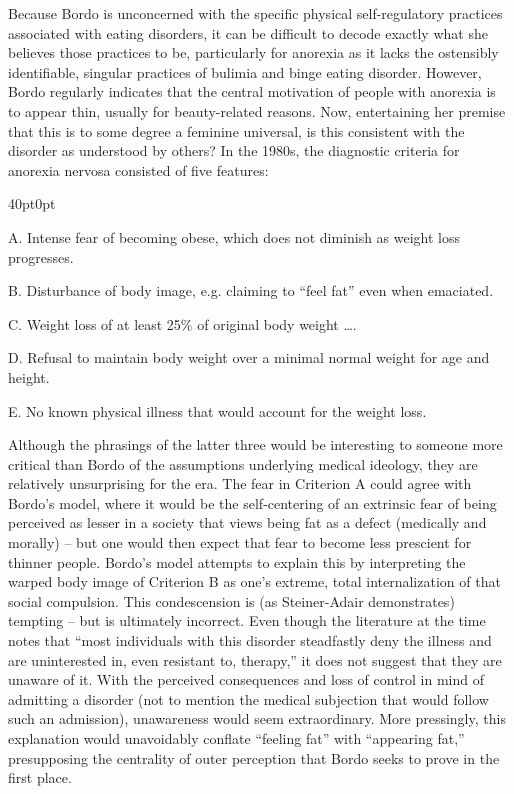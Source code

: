 \documentclass[11pt]{article}
\begin{document}
    Because Bordo is unconcerned with the specific physical self-regulatory practices associated with eating disorders, it can be difficult to decode exactly what she believes those practices to be, particularly for anorexia as it lacks the ostensibly identifiable, singular practices of bulimia and binge eating disorder. However, Bordo regularly indicates that the central motivation of people with anorexia is to appear thin, usually for beauty-related reasons. Now, entertaining her premise that this is to some degree a feminine universal, is this consistent with the disorder as understood by others? In the 1980s, the diagnostic criteria for anorexia nervosa consisted of five features:
    \begin{adjustwidth}{40pt}{0pt}
        \begin{flushleft}
        A. Intense fear of becoming obese, which does not diminish as weight loss progresses.

        B. Disturbance of body image, e.g. claiming to ``feel fat'' even when emaciated.

        C. Weight loss of at least 25\% of original body weight \dots.

        D. Refusal to maintain body weight over a minimal normal weight for age and height.

        E. No known physical illness that would account for the weight loss.~\autocite[68--69]{DSMIII}
        \end{flushleft}
    \end{adjustwidth}
    Although the phrasings of the latter three would be interesting to someone more critical than Bordo of the assumptions underlying medical ideology, they are relatively unsurprising for the era. The fear in Criterion A could agree with Bordo's model, where it would be the self-centering of an extrinsic fear of being perceived as lesser in a society that views being fat as a defect (medically and morally) -- but one would then expect that fear to become less prescient for thinner people. Bordo's model attempts to explain this by interpreting the warped body image of Criterion B as one's extreme, total internalization of that social compulsion. This condescension is (as Steiner-Adair demonstrates) tempting -- but is ultimately incorrect. Even though the literature at the time notes that ``most individuals with this disorder steadfastly deny the illness and are uninterested in, even resistant to, therapy,'' it does not suggest that they are unaware of it. With the perceived consequences and loss of control in mind of admitting a disorder (not to mention the medical subjection that would follow such an admission), unawareness would seem extraordinary. More pressingly, this explanation would unavoidably conflate ``feeling fat'' with ``appearing fat,'' presupposing the centrality of outer perception that Bordo seeks to prove in the first place.
\end{document}
